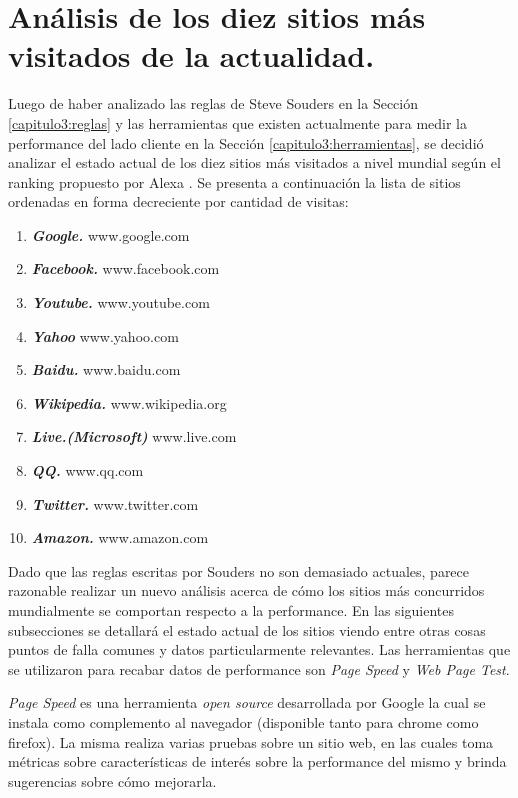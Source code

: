 \section{Análisis de los diez sitios más visitados de la actualidad.}
\label{capitulo3:sitios_visitados}
Luego de haber analizado las reglas de Steve Souders en la Sección \ref{capitulo3:reglas} y las herramientas que existen actualmente para medir la performance del lado cliente en la Sección \ref{capitulo3:herramientas}, se decidió analizar el estado actual de
los diez sitios más visitados a nivel mundial según el ranking propuesto
por Alexa \cite{alexa}. Se presenta a continuación la lista de sitios ordenadas en forma decreciente por cantidad de visitas:

\begin{enumerate}
	\item
	\textbf{\emph{Google.}} www.google.com
	\item
	\textbf{\emph{Facebook.}} www.facebook.com
	\item
	\textbf{\emph{Youtube.}} www.youtube.com
	\item
	\textbf{\emph{Yahoo}} www.yahoo.com
	\item
	\textbf{\emph{Baidu.}} www.baidu.com
	\item
	\textbf{\emph{Wikipedia.}} www.wikipedia.org
	\item
	\textbf{\emph{Live.(Microsoft)}} www.live.com
	\item
	\textbf{\emph{QQ.}} www.qq.com
	\item
	\textbf{\emph{Twitter.}} www.twitter.com
	\item
	\textbf{\emph{Amazon.}} www.amazon.com
\end{enumerate}

Dado que las reglas escritas por Souders no son demasiado actuales, parece razonable realizar un nuevo análisis acerca de cómo los sitios más concurridos mundialmente se
comportan respecto a la performance. En las siguientes subsecciones se detallará el estado actual de los sitios viendo entre otras cosas puntos de falla comunes y datos
particularmente relevantes. Las herramientas que se utilizaron para recabar datos de performance son \emph{Page Speed}\cite{page_speed} y \emph{Web Page
Test}\cite{web_page_test}.

\emph{Page Speed} es una herramienta \emph{open source} desarrollada por Google la cual se instala como complemento al navegador (disponible tanto para chrome como firefox).
La misma realiza varias pruebas sobre un sitio web, en las cuales toma métricas sobre características de interés sobre la performance del mismo y brinda sugerencias sobre
cómo mejorarla.

